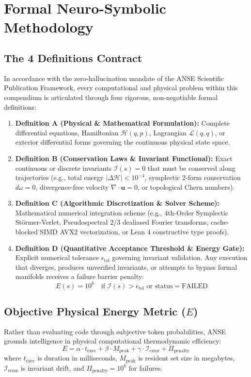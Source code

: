 \section{Formal Neuro-Symbolic Methodology}

\subsection{The 4 Definitions Contract}
In accordance with the zero-hallucination mandate of the ANSE Scientific Publication Framework, every computational and physical problem within this compendium is articulated through four rigorous, non-negotiable formal definitions:

\begin{enumerate}
    \item \textbf{Definition A (Physical \& Mathematical Formulation):} Complete differential equations, Hamiltonian $\mathcal{H}(q, p)$, Lagrangian $\mathcal{L}(q, \dot{q})$, or exterior differential forms governing the continuous physical state space.
    \item \textbf{Definition B (Conservation Laws \& Invariant Functional):} Exact continuous or discrete invariants $\mathcal{I}(s) = 0$ that must be conserved along trajectories (e.g., total energy $|\Delta \mathcal{H}| < 10^{-4}$, symplectic 2-form conservation $d\omega = 0$, divergence-free velocity $\nabla \cdot \mathbf{u} = 0$, or topological Chern numbers).
    \item \textbf{Definition C (Algorithmic Discretization \& Solver Scheme):} Mathematical numerical integration scheme (e.g., 4th-Order Symplectic St\"ormer-Verlet, Pseudospectral 2/3 dealiased Fourier transforms, cache-blocked SIMD AVX2 vectorization, or Lean 4 constructive type proofs).
    \item \textbf{Definition D (Quantitative Acceptance Threshold \& Energy Gate):} Explicit numerical tolerance $\epsilon_{\text{tol}}$ governing invariant validation. Any execution that diverges, produces unverified invariants, or attempts to bypass formal manifolds receives a failure barrier penalty:
    \begin{equation}
        E(s) = 10^6 \quad \text{if } \mathcal{I}(s) > \epsilon_{\text{tol}} \text{ or } \text{status} = \text{FAILED}
    \end{equation}
\end{enumerate}

\subsection{Objective Physical Energy Metric ($E$)}
Rather than evaluating code through subjective token probabilities, ANSE grounds intelligence in physical computational thermodynamic efficiency:
\begin{equation}
    E = \alpha \cdot t_{\text{exec}} + \beta \cdot M_{\text{peak}} + \gamma \cdot \mathcal{I}_{\text{error}} + \Pi_{\text{penalty}}
\end{equation}
where $t_{\text{exec}}$ is duration in milliseconds, $M_{\text{peak}}$ is resident set size in megabytes, $\mathcal{I}_{\text{error}}$ is invariant drift, and $\Pi_{\text{penalty}} = 10^6$ for failures.

